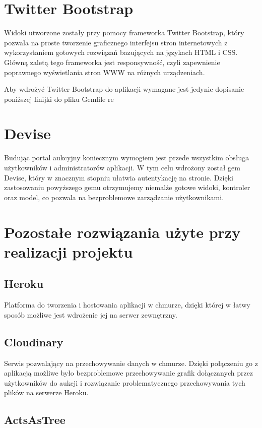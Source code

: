 \documentclass[brudnopis]{xmgr}
\begin{document}
\section{Twitter Bootstrap}
Widoki utworzone zostały przy pomocy frameworka Twitter Bootstrap, który pozwala na proste tworzenie
graficznego interfejsu stron internetowych z wykorzystaniem gotowych rozwiązań bazujących na językach
HTML i CSS. Główną zaletą tego frameworka jest responsywność, czyli zapewnienie poprawnego wyświetlania
stron WWW na różnych urządzeniach. 

Aby wdrożyć Twitter Bootstrap do aplikacji wymagane jest jedynie dopisanie poniższej linijki do pliku Gemfile
re
\section{Devise}

Budując portal aukcyjny koniecznym wymogiem jest przede wszystkim obsługa użytkowników i administratorów aplikacji. W tym celu wdrożony został gem Devise, który w znacznym stopniu ułatwia autentykację na stronie. Dzięki zastosowaniu powyższego gemu otrzymujemy niemalże gotowe widoki, kontroler oraz model, co pozwala na bezproblemowe zarządzanie użytkownikami.

\section{Pozostałe rozwiązania użyte przy realizacji projektu}

\subsection{Heroku} 

Platforma do tworzenia i hostowania aplikacji w chmurze, dzięki której w łatwy sposób możliwe jest wdrożenie jej na serwer zewnętrzny.

\subsection{Cloudinary} 

Serwis pozwalający na przechowywanie danych w chmurze. Dzięki połączeniu go z aplikacją możliwe było bezproblemowe przechowywanie grafik dołączanych przez użytkowników do aukcji i rozwiązanie problematycznego przechowywania tych plików na serwerze Heroku.

\subsection{ActsAsTree} 
\end{document}
